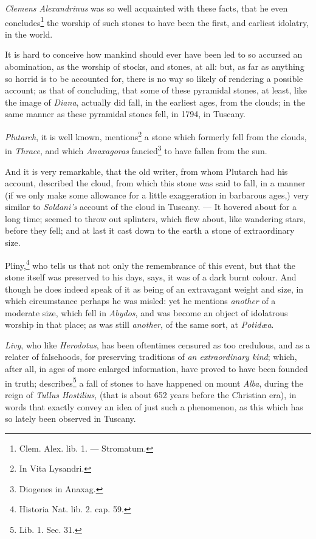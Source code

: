\documentclass[a4paper, 12pt, oneside]{article}
\begin{document}
\emph{Clemens Alexandrinus} was so well acquainted with these facts, that he even concludes\footnote{Clem. Alex. lib. 1. --- Stromatum.} the worship of such stones to have been the first, and earliest idolatry, in the world.

It is hard to conceive how mankind should ever have been led to so accursed an abomination, as the worship of stocks, and stones, at all: but, as far as anything so horrid is to be accounted for, there is no way so likely of rendering a possible account; as that of concluding, that some of these pyramidal stones, at least, like the image of \emph{Diana}, actually did fall, in the earliest ages, from the clouds; in the same manner as these pyramidal stones fell, in 1794, in Tuscany.

\emph{Plutarch}, it is well known, mentions\footnote{In Vita Lysandri.} a stone which formerly fell from the clouds, in \emph{Thrace}, and which \emph{Anaxagoras} fancied\footnote{Diogenes in Anaxag.} to have fallen from the sun.

And it is very remarkable, that the old writer, from whom Plutarch had his account, described the cloud, from which this stone was said to fall, in a manner (if we only make some allowance for a little exaggeration in barbarous ages,) very similar to \emph{Soldani's} account of the cloud in Tuscany. --- It hovered about for a long time; seemed to throw out splinters, which flew about, like wandering stars, before they fell; and at last it cast down to the earth a stone of extraordinary size.

Pliny,\footnote{Historia Nat. lib. 2. cap. 59.} who tells us that not only the remembrance of this event, but that the stone itself was preserved to his days, says, it was of a dark burnt colour. And though he does indeed speak of it as being of an extravagant weight and size, in which circumstance perhaps he was misled: yet he mentions \emph{another} of a moderate size, which fell in \emph{Abydos}, and was become an object of idolatrous worship in that place; as was still \emph{another}, of the same sort, at \emph{Potidæa}.

\emph{Livy}, who like \emph{Herodotus}, has been oftentimes censured as too credulous, and as a relater of falsehoods, for preserving traditions of \emph{an extraordinary kind}; which, after all, in ages of more enlarged information, have proved to have been founded in truth; describes\footnote{Lib. 1. Sec. 31.} a fall of stones to have happened on mount \emph{Alba}, during the reign of \emph{Tullus Hostilius}, (that is about 652 years before the Christian era), in words that exactly convey an idea of just such a phenomenon, as this which has so lately been observed in Tuscany.
\end{document}
